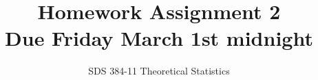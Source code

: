 \documentclass[11pt]{article}
\begin{document}
\title{{\bf Homework Assignment 2}\\Due Friday March 1st midnight}
\author{SDS 384-11 Theoretical Statistics}

\date{}

\maketitle{}
\begin{enumerate}%



\end{enumerate}
\end{document}
